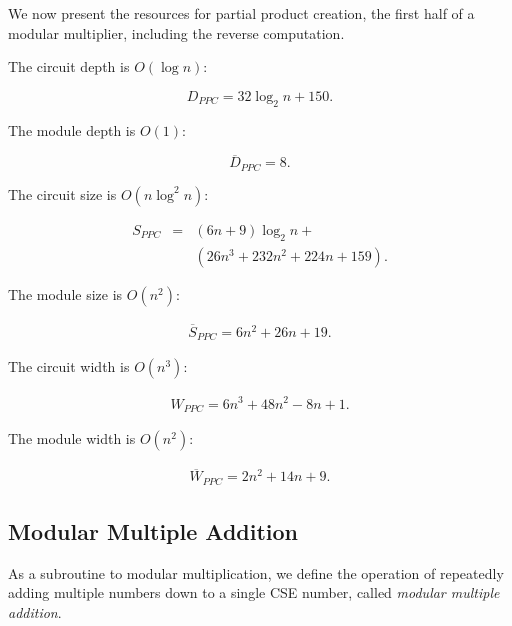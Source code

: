 \documentclass[twoside]{article}
\begin{document}

We now present the resources for partial product creation, the first half of
a modular multiplier, including the reverse computation.

The circuit depth is $O(\log n)$:

\begin{equation}
D_{PPC} = 32\log_2 n + 150\text{.}
\end{equation}

The module depth is $O(1)$:

\begin{equation}
\overline{D}_{PPC} = 8\text{.}
\end{equation}

The circuit size is $O(n\log^2 n)$:

\begin{eqnarray}
S_{PPC} & = & (6n + 9)\log_2 n +\\
        &   & (26n^3 + 232n^2 + 224n + 159)\text{.}
\end{eqnarray}

The module size is $O(n^2)$:

\begin{eqnarray}
\overline{S}_{PPC} = 6n^2 + 26n + 19\text{.}
\end{eqnarray}

The circuit width is $O(n^3)$:

\begin{eqnarray}
W_{PPC} = 6n^3 + 48n^2 - 8n + 1\text{.}
\end{eqnarray}

The module width is $O(n^2)$:

\begin{eqnarray}
\overline{W}_{PPC} = 2n^2 + 14n + 9\text{.}
\end{eqnarray}

\subsection{Modular Multiple Addition}
\label{subsec:mma}

As a subroutine to modular multiplication, we define the operation of
repeatedly adding multiple numbers down to a single CSE number, called
\emph{modular multiple addition}.
\end{document}

